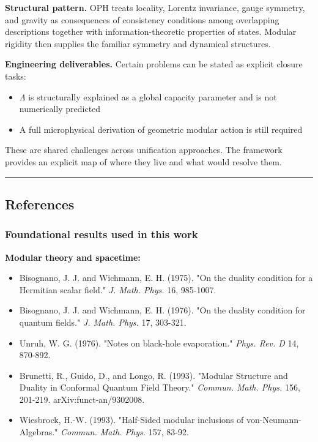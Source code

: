 \textbf{Structural pattern.} OPH treats locality, Lorentz invariance, gauge symmetry, and
gravity as consequences of consistency conditions among overlapping descriptions together with
information-theoretic properties of states. Modular rigidity then supplies the familiar symmetry
and dynamical structures.

\textbf{Engineering deliverables.} Certain problems can be stated as explicit closure tasks:

\begin{itemize}
\tightlist
\item
  \(\Lambda\) is structurally explained as a global capacity parameter and is not numerically predicted
\item
  A full microphysical derivation of geometric modular action is still required
\end{itemize}

These are shared challenges across unification approaches. The framework provides an explicit map of where they live and what would resolve them.

\begin{center}\rule{0.5\linewidth}{0.5pt}\end{center}

\ifdefined\OPHSkipEmbeddedReferences
\else
\subsection{References}\label{references-paper}

\subsubsection{Foundational results used in this work}\label{foundational-results-used-in-this-work}

\textbf{Modular theory and spacetime:}

\begin{itemize}
\tightlist
\item
  Bisognano, J. J. and Wichmann, E. H. (1975). "On the duality condition for a Hermitian scalar field." \emph{J. Math. Phys.} 16, 985-1007.
\item
  Bisognano, J. J. and Wichmann, E. H. (1976). "On the duality condition for quantum fields." \emph{J. Math. Phys.} 17, 303-321.
\item
  Unruh, W. G. (1976). "Notes on black-hole evaporation." \emph{Phys. Rev. D} 14, 870-892.
\item
  Brunetti, R., Guido, D., and Longo, R. (1993). "Modular Structure and Duality in Conformal Quantum Field Theory." \emph{Commun. Math. Phys.} 156, 201-219. arXiv:funct-an/9302008.
\item
  Wiesbrock, H.-W. (1993). "Half-Sided modular inclusions of von-Neumann-Algebras." \emph{Commun. Math. Phys.} 157, 83-92.
\end{itemize}

